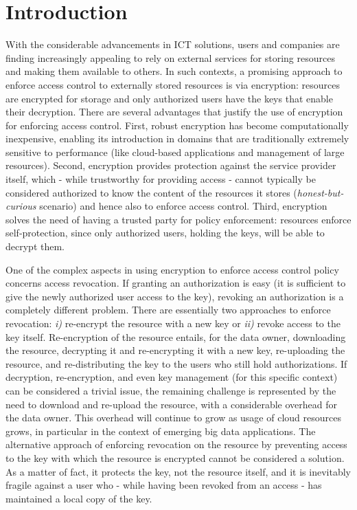 \section{Introduction}\label{ms:sec:intro}

With the considerable advancements in ICT solutions, users and companies are finding increasingly appealing to rely on external services for storing resources and making them available to others. In such contexts, a promising approach to enforce access control to externally stored resources is via encryption: resources are encrypted for storage and only authorized users have the keys that enable their decryption. There are several advantages that justify the use of encryption for enforcing access control. First, robust encryption has become computationally inexpensive, enabling its introduction in domains that are traditionally extremely sensitive to performance (like cloud-based applications and management of large resources). Second, encryption provides protection against the service provider itself, which - while trustworthy for providing access - cannot typically be considered authorized to know the content of the resources it stores ({\em honest-but-curious\/} scenario) and hence also to enforce access control. Third, encryption solves the need of having a trusted party for policy enforcement: resources enforce self-protection, since only authorized users, holding the keys, will be able to decrypt them.
 
One of the complex aspects in using encryption to enforce access control policy concerns access revocation. If granting an authorization is easy (it is sufficient to give the newly authorized user access to the key), revoking an authorization is a completely different problem. There are essentially two approaches to enforce revocation: {\em i)\/} re-encrypt the resource with a new key or {\em ii)\/} revoke access to the key itself. Re-encryption of the resource entails, for the data owner, downloading the resource, decrypting it and re-encrypting it with a new key, re-uploading the resource, and re-distributing the key to the users who still hold authorizations. If decryption, re-encryption, and even key management (for this specific context) can be considered a trivial issue, the remaining challenge is represented by the need to download and re-upload the resource, with a considerable overhead for the data owner. This overhead will continue to grow as usage of cloud resources grows, in particular in the context of emerging big data applications. The alternative approach of enforcing revocation on the resource by preventing access to the key with which the resource is encrypted cannot be considered a solution. As a matter of fact, it protects the key, not the resource itself, and it is inevitably fragile against a user who - while having been revoked from an access - has maintained a local copy of the key.

